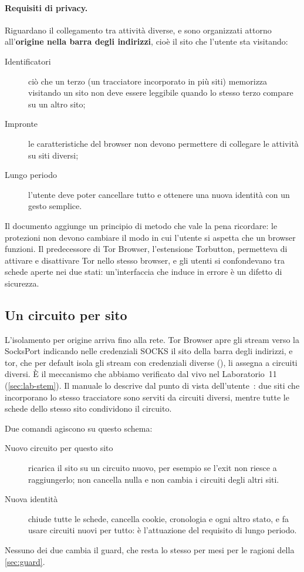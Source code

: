 \paragraph{Requisiti di privacy.} Riguardano il collegamento tra attività diverse, e sono organizzati attorno all'\textbf{origine nella barra degli indirizzi}, cioè il sito che l'utente sta visitando:
\begin{description}
  \item[Identificatori] ciò che un terzo (un tracciatore incorporato in più siti) memorizza visitando un sito non deve essere leggibile quando lo stesso terzo compare su un altro sito;
  \item[Impronte] le caratteristiche del browser non devono permettere di collegare le attività su siti diversi;
  \item[Lungo periodo] l'utente deve poter cancellare tutto e ottenere una nuova identità con un gesto semplice.
\end{description}
Il documento aggiunge un principio di metodo che vale la pena ricordare: le protezioni non devono cambiare il modo in cui l'utente si aspetta che un browser funzioni. Il predecessore di Tor Browser, l'estensione Torbutton, permetteva di attivare e disattivare Tor nello stesso browser, e gli utenti si confondevano tra schede aperte nei due stati: un'interfaccia che induce in errore è un difetto di sicurezza.

\subsection{Un circuito per sito}

L'isolamento per origine arriva fino alla rete. Tor Browser apre gli stream verso la SocksPort indicando nelle credenziali SOCKS il sito della barra degli indirizzi, e tor, che per default isola gli stream con credenziali diverse (), li assegna a circuiti diversi. È il meccanismo che abbiamo verificato dal vivo nel Laboratorio~11 (\cref{sec:lab-stem}). Il manuale lo descrive dal punto di vista dell'utente~\cite{tbmanual}: due siti che incorporano lo stesso tracciatore sono serviti da circuiti diversi, mentre tutte le schede dello stesso sito condividono il circuito.

Due comandi agiscono su questo schema:
\begin{description}
  \item[Nuovo circuito per questo sito] ricarica il sito su un circuito nuovo, per esempio se l'exit non riesce a raggiungerlo; non cancella nulla e non cambia i circuiti degli altri siti.
  \item[Nuova identità] chiude tutte le schede, cancella cookie, cronologia e ogni altro stato, e fa usare circuiti nuovi per tutto: è l'attuazione del requisito di lungo periodo.
\end{description}
Nessuno dei due cambia il guard, che resta lo stesso per mesi per le ragioni della \cref{sec:guard}.

